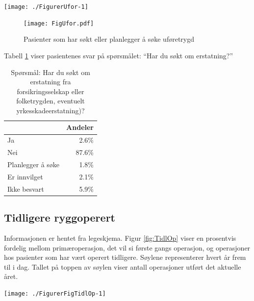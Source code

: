 \documentclass [norsk,a4paper,twoside]{article}\usepackage[]{graphicx}\usepackage[]{color}
\newenvironment{knitrout}{}{} %
\begin{document}
{\centering \texttt{[image: ./FigurerUfor-1]} 

}




\begin{figure}[ht]
	\centering \texttt{[image: FigUfor.pdf]}
	\caption{\label{fig:Ufor} Pasienter som har søkt eller planlegger å søke uføretrygd} 
\end{figure}

Tabell \ref{tab:Erst} viser pasientenes svar på spørsmålet: ``Har du søkt om erstatning?'' 

\begin{table}[ht]
\centering
\begin{tabular}{lr}
  \hline
 & Andeler \\ 
  \hline
Ja & 2.6\% \\ 
  Nei & 87.6\% \\ 
  Planlegger å søke & 1.8\% \\ 
  Er innvilget & 2.1\% \\ 
  Ikke besvart & 5.9\% \\ 
   \hline
\end{tabular}
\caption{Spørsmål: Har du søkt om erstatning fra forsikringsselskap eller folketrygden, 
		eventuelt yrkesskadeerstatning)?} 
\label{tab:Erst}
\end{table}



\subsection{Tidligere ryggoperert}
Informasjonen er hentet fra legeskjema.
Figur \ref{fig:TidlOp} viser en prosentvis fordelig mellom primæroperasjon, det vil si første gangs 
operasjon, og operasjoner hos pasienter som har vært operert tidligere.  
Søylene representerer hvert år frem til i dag. Tallet på toppen av søylen viser antall operasjoner utført 
det aktuelle året.

\begin{knitrout}
\color{fgcolor}

{\centering \texttt{[image: ./FigurerFigTidlOp-1]} 

}



\end{knitrout}
\end{document}
